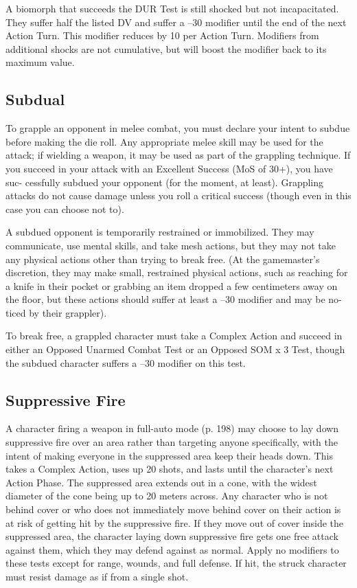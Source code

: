 A biomorph that succeeds the DUR Test is still 
shocked but not incapacitated. They suffer half the 
listed DV and suffer a –30 modifier until the end of 
the next Action Turn. This modifier reduces by 10 per 
Action Turn. Modifiers from additional shocks are 
not cumulative, but will boost the modifier back to 
its maximum value.

\subsection{Subdual}

To grapple an opponent in melee combat, you must 
declare your intent to subdue before making the die 
roll. Any appropriate melee skill may be used for the 
attack; if wielding a weapon, it may be used as part of 
the grappling technique. If you succeed in your attack 
with an Excellent Success (MoS of 30+), you have suc-
cessfully subdued your opponent (for the moment, at 
least). Grappling attacks do not cause damage unless 
you roll a critical success (though even in this case you 
can choose not to).

A subdued opponent is temporarily restrained or 
immobilized. They may communicate, use mental 
skills, and take mesh actions, but they may not take 
any physical actions other than trying to break free. 
(At the gamemaster's discretion, they may make small, 
restrained physical actions, such as reaching for a 
knife in their pocket or grabbing an item dropped a 
few centimeters away on the floor, but these actions 
should suffer at least a –30 modifier and may be no-
ticed by their grappler).

To break free, a grappled character must take a 
Complex Action and succeed in either an Opposed 
Unarmed Combat Test or an Opposed SOM x 3 Test, 
though the subdued character suffers a –30 modifier 
on this test.

\subsection{Suppressive Fire}

A character firing a weapon in full-auto mode (p. 198) 
may choose to lay down suppressive fire over an area 
rather than targeting anyone specifically, with the 
intent of making everyone in the suppressed area keep 
their heads down. This takes a Complex Action, uses 
up 20 shots, and lasts until the character's next Action 
Phase. The suppressed area extends out in a cone, with 
the widest diameter of the cone being up to 20 meters 
across. Any character who is not behind cover or who 
does not immediately move behind cover on their 
action is at risk of getting hit by the suppressive fire. If 
they move out of cover inside the suppressed area, the 
character laying down suppressive fire gets one free 
attack against them, which they may defend against 
as normal. Apply no modifiers to these tests except 
for range, wounds, and full defense. If hit, the struck 
character must resist damage as if from a single shot.

